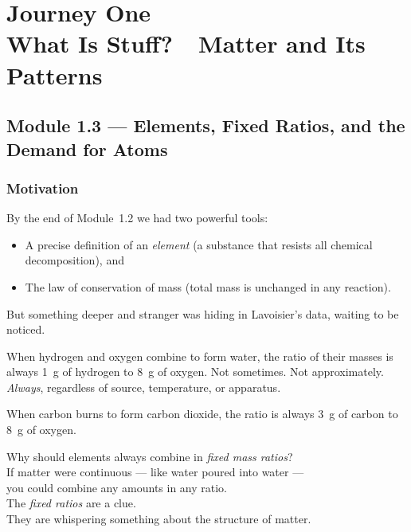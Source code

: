\documentclass[12pt, a4paper]{book}
\theoremstyle{definition}
\begin{document}
\setcounter{chapter}{0}
\chapter[Journey 1 --- What Is Stuff?]
        {Journey One\\[8pt]
         \textcolor{ModuleColor}{\large What Is Stuff?\ \ Matter and Its Patterns}}
\setcounter{section}{2}

\section{Module 1.3 --- Elements, Fixed Ratios, and the Demand for Atoms}
\label{sec:mod1.3}

\subsection*{Motivation}

By the end of Module~1.2 we had two powerful tools:
\begin{itemize}[leftmargin=2em, nosep]
  \item A precise definition of an \emph{element}
        (a substance that resists all chemical decomposition), and
  \item The law of conservation of mass
        (total mass is unchanged in any reaction).
\end{itemize}

\vspace{0.4em}

But something deeper and stranger was hiding in Lavoisier's data,
waiting to be noticed.

When hydrogen and oxygen combine to form water,
the ratio of their masses is always
\SI{1}{\gram} of hydrogen to \SI{8}{\gram} of oxygen.
Not sometimes. Not approximately. \emph{Always}, regardless
of source, temperature, or apparatus.

When carbon burns to form carbon dioxide,
the ratio is always
\SI{3}{\gram} of carbon to \SI{8}{\gram} of oxygen.

\begin{center}
\begin{tcolorbox}[
  enhanced, colback=LightBg, colframe=JourneyColor!40,
  width=0.86\textwidth, arc=3pt, fontupper=\sffamily
]
\centering
Why should elements always combine in \emph{fixed mass ratios}?\\[6pt]
\small
If matter were continuous --- like water poured into water ---\\
you could combine any amounts in any ratio.\\[4pt]
\normalsize
The \emph{fixed ratios} are a clue.\\
They are whispering something about the structure of matter.
\end{tcolorbox}
\end{center}
\end{document}
